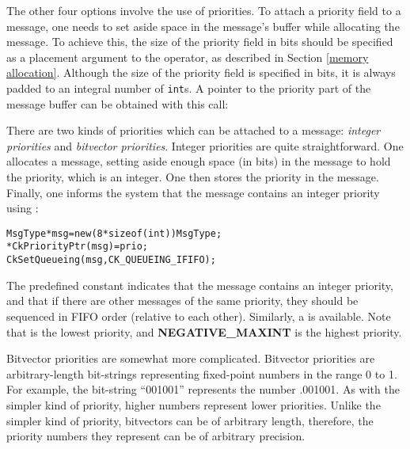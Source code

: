 The other four options involve the use of priorities.  To
attach a priority field to a message, one needs to set aside space in the
message's buffer while allocating the message.  To
achieve this, the size of the priority field in bits
should be specified as a placement argument to the  operator, as
described in Section \ref{memory allocation}.  Although the size of the
priority field is specified in bits, it is always padded to an integral number
of {\tt int}s.  A pointer to the priority part of the message buffer can be
obtained with this call:


There are two kinds of priorities which can be attached to a message:
{\sl integer priorities} and {\sl bitvector
priorities}.  Integer priorities are quite
straightforward.  One allocates a message, setting aside enough space
(in bits) in the message to hold the priority, which is an integer.
One then stores the priority in the message.  Finally, one informs the
system that the message contains an integer priority using
:

\begin{alltt}
  MsgType *msg = new (8*sizeof(int)) MsgType;
  *CkPriorityPtr(msg) = prio;
  CkSetQueueing(msg, CK_QUEUEING_IFIFO);
\end{alltt}

The predefined constant   indicates that the
message contains an integer priority, and that if there are other
messages of the same priority, they should be sequenced in FIFO order
(relative to each other).  Similarly, a   is
available.  Note that   is the lowest priority, and {\bf
NEGATIVE\_MAXINT} is the highest priority.

Bitvector priorities are somewhat more complicated.  Bitvector
priorities are arbitrary-length bit-strings representing fixed-point
numbers in the range 0 to 1.  For example, the bit-string ``001001''
represents the number .001001\raisebox{-.5ex}{\scriptsize binary}.  As
with the simpler kind of priority, higher numbers represent lower
priorities.  Unlike the simpler kind of priority, bitvectors can be of
arbitrary length, therefore, the priority numbers they represent can
be of arbitrary precision.

